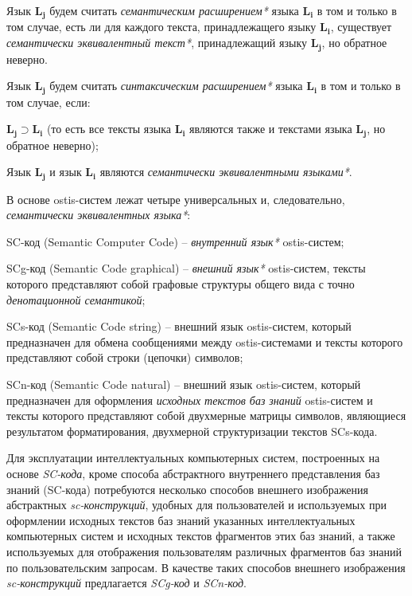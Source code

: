 \begin{SCn}
{Язык $\bm{L_j}$ будем считать \textit{семантическим расширением*} языка $\bm{L_i}$ в том и только в том случае, есть ли для каждого текста, принадлежащего языку $\bm{L_i}$, существует \textit{семантически эквивалентный текст*}, принадлежащий языку $\bm{L_j}$, но обратное неверно. 

Язык $\bm{L_j}$ будем считать \textit{синтаксическим расширением*} языка $\bm{L_i}$ в том и только в том случае, если:

\begin{scnitemize}
\item $\bm{L_j} \supset \bm{L_i}$ (то есть все тексты языка $\bm{L_i}$ являются также и текстами языка $\bm{L_j}$, но обратное неверно);
\item Язык $\bm{L_j}$ и язык $\bm{L_i}$ являются \textit{семантически эквивалентными языками*}.
\end{scnitemize}

В основе ostis-систем лежат четыре универсальных и, следовательно, \textit{семантически эквивалентных языка*}: 
\begin{scnitemize}
\item SC-код (Semantic Computer Code) -- \textit{внутренний язык*} ostis-систем; 
\item SCg-код (Semantic Code graphical) -- \textit{внешний язык*} ostis-систем, тексты которого представляют собой графовые структуры общего вида с точно \textit{денотационной семантикой};
\item SCs-код (Semantic Code string) -- внешний язык ostis-систем, который предназначен для обмена сообщениями между ostis-системами и тексты которого представляют собой строки (цепочки) символов;
\item SCn-код (Semantic Code natural) -- внешний язык ostis-систем, который предназначен для оформления \textit{исходных текстов баз знаний} ostis-систем и тексты которого представляют собой двухмерные матрицы символов, являющиеся результатом форматирования, двухмерной структуризации текстов SCs-кода.
\end{scnitemize}

Для эксплуатации интеллектуальных компьютерных систем,  построенных на основе \textit{SC-кода}, кроме способа абстрактного внутреннего представления баз знаний (SC-кода) потребуются несколько способов внешнего изображения абстрактных \textit{sc-конструкций}, удобных для пользователей и используемых при оформлении исходных текстов баз знаний указанных интеллектуальных компьютерных систем и исходных текстов фрагментов этих баз знаний, а также используемых для отображения пользователям различных фрагментов баз знаний по пользовательским запросам. В качестве таких способов внешнего изображения \textit{sc-конструкций} предлагается \textit{SCg-код} и \textit{SCn-код}.

}
\end{SCn}
